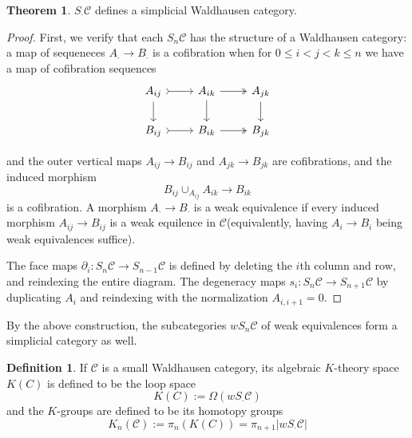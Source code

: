 \documentclass{article}
\theoremstyle{definition}
\newtheorem{theorem}{Theorem}[section]
\theoremstyle{definition}
\newtheorem{definition}{Definition}[theorem]
\theoremstyle{definition}
\theoremstyle{definition}
\theoremstyle{definition}
\theoremstyle{definition}
\theoremstyle{definition}
\begin{document}
\begin{tcolorbox}[colback=red!5!white,colframe=red!30!white]
\begin{theorem}
    $S_{\cdot} \mathcal{C}$ defines a simplicial Waldhausen category. 
\end{theorem}
\end{tcolorbox}
\begin{proof}
    First, we verify that each $S_n \mathcal{C}$ has the structure of a Waldhausen category: a map of sequeneces $A_{\cdot}\to B_{\cdot}$ is a cofibration when for $0\leq i<j< k\leq n$ we have a map of cofibration sequences 
    \[\begin{tikzcd}
        {A_{ij}} & {A_{ik}} & {A_{jk}} \\
        {B_{ij}} & {B_{ik}} & {B_{jk}}
        \arrow[tail, from=1-1, to=1-2]
        \arrow[from=1-1, to=2-1]
        \arrow[two heads, from=1-2, to=1-3]
        \arrow[from=1-2, to=2-2]
        \arrow[from=1-3, to=2-3]
        \arrow[tail, from=2-1, to=2-2]
        \arrow[two heads, from=2-2, to=2-3]
    \end{tikzcd}\]

and the outer vertical maps $A_{ij}\to B_{ij}$ and $A_{jk}\to B_{jk}$ are cofibrations, and the induced morphism $$B_{ij}\cup_{A_{ij}}A_{ik}\to B_{ik}$$ is a cofibration. A morphism $A_{\cdot}\to B_{\cdot}$ is a weak equivalence if every induced morphism $A_{ij}\to B_{ij}$ is a weak equilence in $\mathcal{C}$(equivalently, having $A_i\to B_i$ being weak equivalences suffice).

The face maps $\partial_i: S_n \mathcal{C}\to S_{n-1} \mathcal{C}$ is defined by deleting the $i$th column and row, and reindexing the entire diagram. The degeneracy maps $s_i: S_n \mathcal{C}\to S_{n+1} \mathcal{C}$ by duplicating $A_i$ and reindexing with the normalization $A_{i,i+1}=0$. 
\end{proof}
By the above construction, the subcategories $wS_n \mathcal{C}$ of weak equivalences form a simplicial category as well.


\begin{tcolorbox}[colback=purple!5!white,colframe=purple!75!black]
\begin{definition}
If $\mathcal{C}$ is a small Waldhausen category, its algebraic $K$-theory space $K(C)$ is defined to be the loop space
\[K(C):= \Omega (wS_{\cdot} \mathcal{C})\]
and the $K$-groups are defined to be its homotopy groups 
\[K_n(\mathcal{C}):=\pi_n(K(C))=\pi_{n+1}|wS_{\cdot}\mathcal{C}|\]
\end{definition}
\end{tcolorbox}
\end{document}
